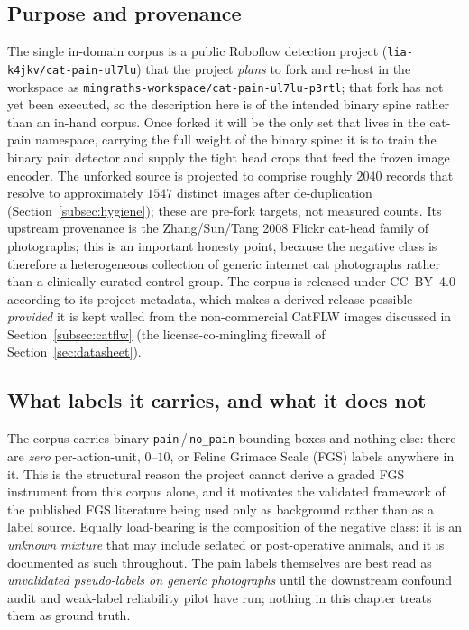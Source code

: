 \subsection{Purpose and provenance}

The single in-domain corpus is a public Roboflow detection project
(\texttt{lia-k4jkv/cat-pain-ul7lu}) that the project \emph{plans} to fork and
re-host in the workspace as
\texttt{mingraths-workspace/cat-pain-ul7lu-p3rtl}; that fork has not yet been
executed, so the description here is of the intended binary spine rather than an
in-hand corpus. Once forked it will be the only set that lives in the cat-pain
namespace, carrying the full weight of the binary spine: it is to train the
binary pain detector and supply the tight head crops that feed the frozen image
encoder. The unforked source is projected to comprise roughly $2040$ records
that resolve to approximately $1547$ distinct images after de-duplication
(Section~\ref{subsec:hygiene}); these are pre-fork targets, not measured counts. Its upstream provenance is the Zhang/Sun/Tang
2008 Flickr cat-head family of photographs; this is an important honesty point,
because the negative class is therefore a heterogeneous collection of generic
internet cat photographs rather than a clinically curated control group. The
corpus is released under CC~BY~4.0 according to its project metadata, which
makes a derived release possible \emph{provided} it is kept walled from the
non-commercial CatFLW images discussed in
Section~\ref{subsec:catflw} (the license-co-mingling firewall of
Section~\ref{sec:datasheet}).

\subsection{What labels it carries, and what it does not}

The corpus carries binary \texttt{pain}\,/\,\texttt{no\_pain} bounding boxes and
nothing else: there are \emph{zero} per-action-unit, $0$--$10$, or
Feline Grimace Scale (FGS) labels anywhere in it. This is the structural reason
the project cannot derive a graded FGS instrument from this corpus alone, and
it motivates the validated framework of the published FGS literature
\citep{evangelista2019} being used only as background rather than as a label
source. Equally load-bearing is the composition of the negative class: it is an
\emph{unknown mixture} that may include sedated or post-operative animals, and
it is documented as such throughout. The pain labels themselves are best read as
\emph{unvalidated pseudo-labels on generic photographs} until the downstream
confound audit and weak-label reliability pilot have run; nothing in this
chapter treats them as ground truth.

